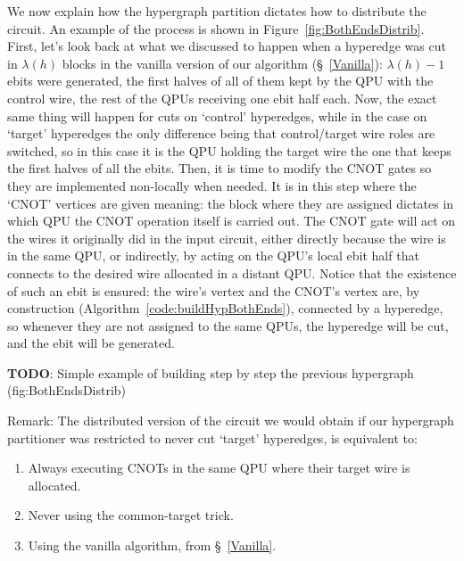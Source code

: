 We now explain how the hypergraph partition dictates how to distribute the circuit. An example of the process is shown in Figure~\ref{fig:BothEndsDistrib}. First, let's look back at what we discussed to happen when a hyperedge was cut in \(\lambda(h)\) blocks in the vanilla version of our algorithm (\S~\ref{Vanilla}): \(\lambda(h)-1\) ebits were generated, the first halves of all of them kept by the QPU with the control wire, the rest of the QPUs receiving one ebit half each. Now, the exact same thing will happen for cuts on `control' hyperedges, while in the case on `target' hyperedges the only difference being that control/target wire roles are switched, so in this case it is the QPU holding the target wire the one that keeps the first halves of all the ebits. Then, it is time to modify the CNOT gates so they are implemented non-locally when needed. It is in this step where the `CNOT' vertices are given meaning: the block where they are assigned dictates in which QPU the CNOT operation itself is carried out. The CNOT gate will act on the wires it originally did in the input circuit, either directly because the wire is in the same QPU, or indirectly, by acting on the QPU's local ebit half that connects to the desired wire allocated in a distant QPU. Notice that the existence of such an ebit is ensured: the wire's vertex and the CNOT's vertex are, by construction (Algorithm~\ref{code:buildHypBothEnds}), connected by a hyperedge, so whenever they are not assigned to the same QPUs, the hyperedge will be cut, and the ebit will be generated.

\textbf{TODO}: Simple example of building step by step the previous hypergraph (fig:BothEndsDistrib)

Remark: The distributed version of the circuit we would obtain if our hypergraph partitioner was restricted to never cut `target' hyperedges, is equivalent to:
\begin{enumerate}
  \item Always executing CNOTs in the same QPU where their target wire is allocated.
  \item Never using the common-target trick.
  \item Using the vanilla algorithm, from \S~\ref{Vanilla}.
\end{enumerate}

